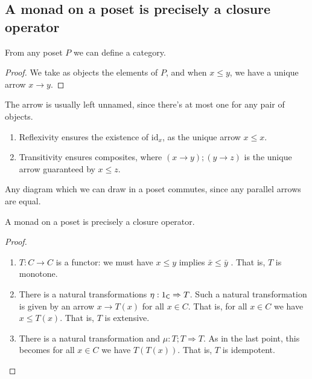 \documentclass[dvipdfmx,autodetect-engine]{jsarticle}
\begin{document}
\subsection{A monad on a poset is precisely a closure operator}

\begin{fact}
From any poset $P$  we can define a category.
\end{fact}

\begin{proof}
We take as objects the elements of $P$, 
and when $x \leq y$, 
we have a unique arrow $x \rightarrow y$. 
\end{proof}

The arrow is usually left unnamed, since there's at most one for any pair of objects. 

\begin{enumerate}
    \item Reflexivity ensures the existence of $\mbox{id}_x$, 
as the unique arrow $x \leq x$.
    \item Transitivity ensures composites,
where  $(x \rightarrow y) ; (y \rightarrow z)$ 
is the unique arrow guaranteed by $x \leq z$. 
\end{enumerate}

\begin{fact}
Any diagram which we can draw in a poset commutes, since any parallel arrows are equal.
\end{fact}

\begin{proposition}
A monad on a poset is precisely a closure operator. 
\end{proposition}

\begin{proof}
\begin{enumerate}
    \item $T : C \rightarrow C$ is a functor: we must have $x \leq y$ implies $\bar{x} \leq \bar{y}$ . That is,  $T$ is monotone.
    \item There is a natural transformations 
$\eta : \mbox{1}_{\sf{C}} \Rightarrow T$.
Such a natural transformation is given by an arrow $x \rightarrow T(x)$  for all $x \in C$. 
That is, for all  $x \in C$ we have $x \leq T(x)$.
 That is, $T$ is extensive.
    \item 
There is a natural transformation and $\mu : T ; T \Rightarrow T$. As in the last point, this becomes for all $x \in C$  we have $T(T(x))$. 
That is, $T$ is idempotent.
\end{enumerate}
\end{proof}
\end{document}
